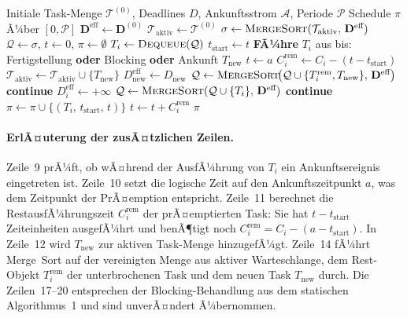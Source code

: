 ﻿\documentclass[a4paper,12pt]{article}
\theoremstyle{definition}
\begin{document}
	\begin{algorithm}[H]
		\caption{EDF$^+_{\mathrm{dyn}}$ -- Scheduling Algorithm for Dynamic Task Sets}
		\label{alg:edfdyn}
		\begin{algorithmic}[1]
			\Require Initiale Task-Menge $\mathcal{T}^{(0)}$, Deadlines $D$, Ankunftsstrom $\mathcal{A}$, Periode $\mathcal{P}$
			\Ensure Schedule $\pi$ Ã¼ber $[0,\mathcal{P}]$
			\State $\mathbf{D}^{\text{eff}} \leftarrow \mathbf{D}^{(0)}$
			\State $\mathcal{T}_{\text{aktiv}} \leftarrow \mathcal{T}^{(0)}$
			\State $\sigma \leftarrow \textsc{MergeSort}(\mathcal{T}_{\text{aktiv}},\, \mathbf{D}^{\text{eff}})$
			\State $\mathcal{Q} \leftarrow \sigma$, $t \leftarrow 0$, $\pi \leftarrow \emptyset$
			\State $T_i \leftarrow \textsc{Dequeue}(\mathcal{Q})$
			\State $t_{\text{start}} \leftarrow t$
			\State \textbf{FÃ¼hre} $T_i$ aus bis: Fertigstellung \textbf{oder} Blocking \textbf{oder} Ankunft $T_{\text{new}}$
			\State $t \leftarrow a$ 
			\State $C_i^{\text{rem}} \leftarrow C_i - (t - t_{\text{start}})$ 
			\State $\mathcal{T}_{\text{aktiv}} \leftarrow \mathcal{T}_{\text{aktiv}} \cup \{T_{\text{new}}\}$
			\State $D_{\text{new}}^{\text{eff}} \leftarrow D_{\text{new}}$
			\State $\mathcal{Q} \leftarrow \textsc{MergeSort}\!\bigl(\mathcal{Q} \cup \{T_i^{\text{rem}}, T_{\text{new}}\},\, \mathbf{D}^{\text{eff}}\bigr)$
			\State \textbf{continue}
			\EndIf
			\State $D_i^{\text{eff}} \leftarrow +\infty$
			\State $\mathcal{Q} \leftarrow \textsc{MergeSort}(\mathcal{Q} \cup \{T_i\},\, \mathbf{D}^{\text{eff}})$
			\State \textbf{continue}
			\EndIf
			\State $\pi \leftarrow \pi \cup \{(T_i,\, t_{\text{start}},\, t)\}$
			\State $t \leftarrow t + C_i^{\text{rem}}$
			\EndWhile
			\State \Return $\pi$
		\end{algorithmic}
	\end{algorithm}

	\paragraph{ErlÃ¤uterung der zusÃ¤tzlichen Zeilen.}
	Zeile~9 prÃ¼ft, ob wÃ¤hrend der AusfÃ¼hrung von $T_i$ ein Ankunftsereignis
	eingetreten ist. Zeile~10 setzt die logische Zeit auf den Ankunftszeitpunkt $a$,
	was dem Zeitpunkt der PrÃ¤emption entspricht. Zeile~11 berechnet die
	RestausfÃ¼hrungszeit $C_i^{\text{rem}}$ der prÃ¤emptierten Task: Sie hat
	$t - t_{\text{start}}$ Zeiteinheiten ausgefÃ¼hrt und benÃ¶tigt noch
	$C_i^{\text{rem}} = C_i - (a - t_{\text{start}})$. In Zeile~12 wird
	$T_{\text{new}}$ zur aktiven Task-Menge hinzugefÃ¼gt. Zeile~14 fÃ¼hrt Merge~Sort
	auf der vereinigten Menge aus aktiver Warteschlange, dem Rest-Objekt $T_i^{\text{rem}}$
	der unterbrochenen Task und dem neuen Task $T_{\text{new}}$ durch. Die Zeilen~17--20
	entsprechen der Blocking-Behandlung aus dem statischen Algorithmus~1 und sind
	unverÃ¤ndert Ã¼bernommen.
\end{document}
